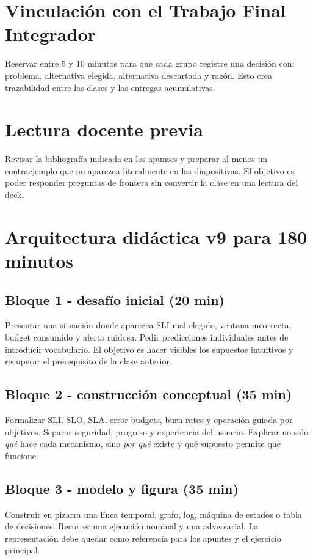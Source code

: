 \documentclass[variant=docente,cover=institutional,mode=screen]{ua-engineering-v6-article}
\begin{document}
\section{Vinculación con el Trabajo Final Integrador}
Reservar entre 5 y 10 minutos para que cada grupo registre una decisión con: problema, alternativa elegida, alternativa descartada y razón. Esto crea trazabilidad entre las clases y las entregas acumulativas.
\section{Lectura docente previa}
Revisar la bibliografía indicada en los apuntes y preparar al menos un contraejemplo que no aparezca literalmente en las diapositivas. El objetivo es poder responder preguntas de frontera sin convertir la clase en una lectura del deck.

\section{Arquitectura didáctica v9 para 180 minutos}
\subsection*{Bloque 1 - desafío inicial (20 min)}
Presentar una situación donde aparezca SLI mal elegido, ventana incorrecta, budget consumido y alerta ruidosa. Pedir predicciones individuales antes de introducir vocabulario. El objetivo es hacer visibles los supuestos intuitivos y recuperar el prerequisito de la clase anterior.

\subsection*{Bloque 2 - construcción conceptual (35 min)}
Formalizar SLI, SLO, SLA, error budgets, burn rates y operación guiada por objetivos. Separar seguridad, progreso y experiencia del usuario. Explicar no solo \emph{qué} hace cada mecanismo, sino \emph{por qué} existe y qué supuesto permite que funcione.

\subsection*{Bloque 3 - modelo y figura (35 min)}
Construir en pizarra una línea temporal, grafo, log, máquina de estados o tabla de decisiones. Recorrer una ejecución nominal y una adversarial. La representación debe quedar como referencia para los apuntes y el ejercicio principal.
\end{document}
